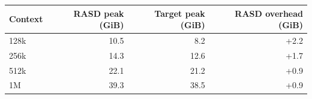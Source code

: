 \begin{tabular}{lrrr}
\toprule
Context & RASD peak (GiB) & Target peak (GiB) & RASD overhead (GiB) \\
\midrule
128k & 10.5 & 8.2 & +2.2 \\
256k & 14.3 & 12.6 & +1.7 \\
512k & 22.1 & 21.2 & +0.9 \\
1M & 39.3 & 38.5 & +0.9 \\
\bottomrule
\end{tabular}
